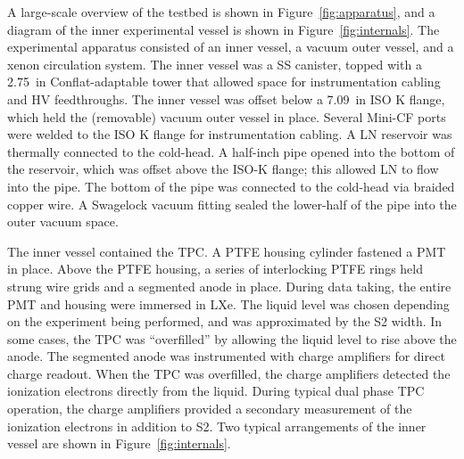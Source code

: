 A large-scale overview of the testbed is shown in Figure~\ref{fig:apparatus}, and a diagram of the inner experimental vessel is shown in Figure~\ref{fig:internals}. The experimental apparatus consisted of an inner vessel, a vacuum outer vessel, and a xenon circulation system. The inner vessel was a \ac{SS} canister, topped with a 2.75~in Conflat-adaptable tower that allowed space for instrumentation cabling and \ac{HV} feedthroughs. The inner vessel was offset below a 7.09~in ISO K flange, which held the (removable) vacuum outer vessel in place. Several Mini-CF ports were welded to the ISO K flange for instrumentation cabling. A \ac{LN} reservoir was thermally connected to the cold-head. A half-inch pipe opened into the bottom of the reservoir, which was offset above the ISO-K flange; this allowed \ac{LN} to flow into the pipe. The bottom of the pipe was connected to the cold-head via braided copper wire. A Swagelock vacuum fitting sealed the lower-half of the pipe into the outer vacuum space.

The inner vessel contained the \ac{TPC}. A \ac{PTFE} housing cylinder fastened a \ac{PMT} in place. Above the \ac{PTFE} housing, a series of interlocking \ac{PTFE} rings held strung wire grids and a segmented anode in place. During data taking, the entire \ac{PMT} and housing were immersed in \ac{LXe}. The liquid level was chosen depending on the experiment being performed, and was approximated by the S2 width. In some cases, the \ac{TPC} was ``overfilled'' by allowing the liquid level to rise above the anode. The segmented anode was instrumented with charge amplifiers for direct charge readout. When the \ac{TPC} was overfilled, the charge amplifiers detected the ionization electrons directly from the liquid. During typical dual phase \ac{TPC} operation, the charge amplifiers provided a secondary measurement of the ionization electrons in addition to S2. Two typical arrangements of the inner vessel are shown in Figure~\ref{fig:internals}.

